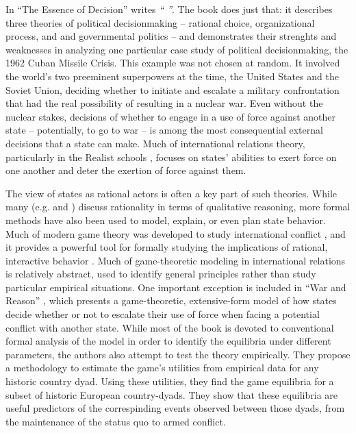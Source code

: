 


In ``The Essence of Decision'' \citep{allison_1999} writes \emph{`` ''}. The book does just that: it describes three theories of political decisionmaking -- rational choice, organizational process, and and governmental politics -- and demonstrates their strenghts and weaknesses in analyzing one particular case study of political decisionmaking, the 1962 Cuban Missile Crisis. This example was not chosen at random. It involved the world's two preeminent superpowers at the time, the United States and the Soviet Union, deciding whether to initiate and escalate a military confrontation that had the real possibility of resulting in a nuclear war. Even without the nuclear stakes, decisions of whether to engage in a use of force against another state -- potentially, to go to war -- is among the most consequential external decisions that a state can make. Much of international relations theory, particularly in the Realist schools \citep{keohane_1986}, focuses on states' abilities to exert force on one another and deter the exertion of force against them. 

The view of states as rational actors is often a key part of such theories. While many (e.g. \citet{} and \citet{allison_1999}) discuss rationality in terms of qualitative reasoning, more formal methods have also been used to model, explain, or even plan state behavior. Much of modern game theory was developed to study international conflict \citep{gates_1997}, and it provides a powerful tool for formally studying the implications of rational, interactive behavior \citep{snidal_1985}. Much of game-theoretic modeling in international relations is relatively abstract, used to identify general principles rather than study particular empirical situations. One important exception is included in ``War and Reason'' \citep{bdm_1992}, which presents a game-theoretic, extensive-form model of how states decide whether or not to escalate their use of force when facing a potential conflict with another state. While most of the book is devoted to conventional formal analysis of the model in order to identify the equilibria under different parameters, the authors also attempt to test the theory empirically. They propose a methodology to estimate the game's utilities from empirical data for any historic country dyad. Using these utilities, they find the game equilibria for a subset of historic European country-dyads. They show that these equilibria are useful predictors of the correspinding events observed between those dyads, from the maintenance of the status quo to armed conflict.

